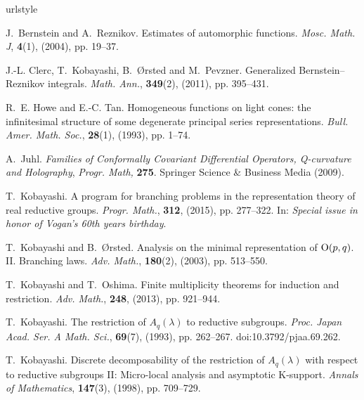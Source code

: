 \begin{thebibliography}{CK{\O}P11}
\expandafter\ifx\csname urlstyle\endcsname\relax
  \providecommand{\doi}[1]{doi:\discretionary{}{}{}#1}\else
  \providecommand{\doi}{doi:\discretionary{}{}{}\begingroup
  \urlstyle{rm}\Url}\fi

J.~Bernstein and A.~Reznikov.
\newblock Estimates of automorphic functions.
\newblock \emph{Mosc. Math. J}, \textbf{\textbf{4}}(1), (2004), pp. 19--37.

J.-L. Clerc, T.~Kobayashi, B.~{\O}rsted and M.~Pevzner.
\newblock Generalized {B}ernstein--{R}eznikov integrals.
\newblock \emph{Math. Ann.}, \textbf{349}(2), (2011), pp. 395--431.

R.~E. Howe and E.-C. Tan.
\newblock Homogeneous functions on light cones: the infinitesimal structure of
  some degenerate principal series representations.
\newblock \emph{Bull. Amer. Math. Soc.}, \textbf{28}(1), (1993), pp. 1--74.

A.~Juhl.
\newblock \emph{Families of {C}onformally {C}ovariant {D}ifferential
  {O}perators, {Q}-curvature and {H}olography}, \emph{Progr. Math,}
  \textbf{275}.
\newblock Springer Science \& Business Media (2009).

T.~Kobayashi.
\newblock A program for branching problems in the representation theory of real
  reductive groups.
\newblock \emph{Progr. Math.}, \textbf{312}, (2015), pp. 277--322.
\newblock In: \emph{{\normalfont Special issue in honor of Vogan's 60th years
  birthday}}.

T.~Kobayashi and B.~{\O}rsted.
\newblock Analysis on the minimal representation of\/ {$\mbox{\rm O}(p,q)$}.{$\;$}{{\rm{II}}}. {B}ranching laws.
\newblock \emph{Adv. Math.}, \textbf{180}(2), (2003), pp. 513--550.

T.~Kobayashi and T.~Oshima.
\newblock Finite multiplicity theorems for induction and restriction.
\newblock \emph{Adv. Math.}, \textbf{248}, (2013), pp. 921--944.

T.~Kobayashi.
\newblock The restriction of ${A}_q \left( \lambda \right)$ to reductive
  subgroups.
\newblock \emph{Proc. Japan Acad. Ser. A Math. Sci.}, \textbf{69}(7), (1993),
  pp. 262--267.
\newblock \doi{10.3792/pjaa.69.262}.

T.~Kobayashi.
\newblock Discrete decomposability of the restriction of ${A}_q(\lambda)$ with
  respect to reductive subgroups {I}{I}: Micro-local analysis and asymptotic
  {K}-support.
\newblock \emph{Annals of Mathematics}, \textbf{147}(3), (1998), pp. 709--729.


\end{thebibliography}
